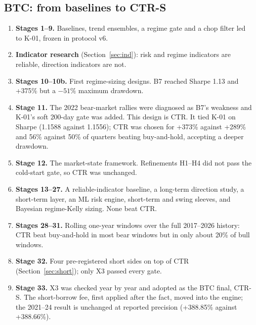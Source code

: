 \documentclass[11pt,a4paper]{article}
\theoremstyle{definition}
\begin{document}
\subsection{BTC: from baselines to CTR-S}
\begin{enumerate}
\item \textbf{Stages 1--9.} Baselines, trend ensembles, a regime gate and a chop filter led to K-01, frozen in protocol v6.
\item \textbf{Indicator research} (Section~\ref{sec:ind}): risk and regime indicators are reliable, direction indicators are not.
\item \textbf{Stages 10--10b.} First regime-sizing designs. B7 reached Sharpe 1.13 and +375\% but a $-51\%$ maximum drawdown.
\item \textbf{Stage 11.} The 2022 bear-market rallies were diagnosed as B7's weakness and K-01's soft 200-day gate was added. This design is CTR. It tied K-01 on Sharpe (1.1588 against 1.1556); CTR was chosen for +373\% against +289\% and 56\% against 50\% of quarters beating buy-and-hold, accepting a deeper drawdown.
\item \textbf{Stage 12.} The market-state framework. Refinements H1--H4 did not pass the cold-start gate, so CTR was unchanged.
\item \textbf{Stages 13--27.} A reliable-indicator baseline, a long-term direction study, a short-term layer, an ML risk engine, short-term and swing sleeves, and Bayesian regime-Kelly sizing. None beat CTR.
\item \textbf{Stages 28--31.} Rolling one-year windows over the full 2017--2026 history: CTR beat buy-and-hold in most bear windows but in only about 20\% of bull windows.
\item \textbf{Stage 32.} Four pre-registered short sides on top of CTR (Section~\ref{sec:short}); only X3 passed every gate.
\item \textbf{Stage 33.} X3 was checked year by year and adopted as the BTC final, CTR-S. The short-borrow fee, first applied after the fact, moved into the engine; the 2021--24 result is unchanged at reported precision (+388.85\% against +388.66\%).
\end{enumerate}
\end{document}
